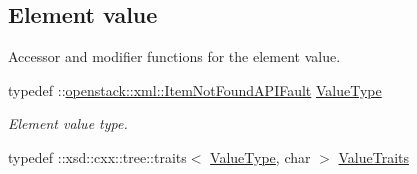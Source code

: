 \subsection*{Element value}
\label{_amgrp2ee2eae1a8c390ea033f241c027da8d6}
Accessor and modifier functions for the element value. \begin{DoxyCompactItemize}
\item 
\hypertarget{classopenstack_1_1xml_1_1ItemNotFound_ab341cfe17dc377b45ed2c965ee0e77dd}{
typedef ::\hyperlink{classopenstack_1_1xml_1_1ItemNotFoundAPIFault}{openstack::xml::ItemNotFoundAPIFault} \hyperlink{classopenstack_1_1xml_1_1ItemNotFound_ab341cfe17dc377b45ed2c965ee0e77dd}{ValueType}}
\label{classopenstack_1_1xml_1_1ItemNotFound_ab341cfe17dc377b45ed2c965ee0e77dd}

\begin{DoxyCompactList}\small\item\em Element value type. \item\end{DoxyCompactList}\item 
\hypertarget{classopenstack_1_1xml_1_1ItemNotFound_a49413bd4328e470b23ce0e13f55db070}{
typedef ::xsd::cxx::tree::traits$<$ \hyperlink{classopenstack_1_1xml_1_1ItemNotFoundAPIFault}{ValueType}, char $>$ \hyperlink{classopenstack_1_1xml_1_1ItemNotFound_a49413bd4328e470b23ce0e13f55db070}{ValueTraits}}
\label{classopenstack_1_1xml_1_1ItemNotFound_a49413bd4328e470b23ce0e13f55db070}


\end{DoxyCompactItemize}
